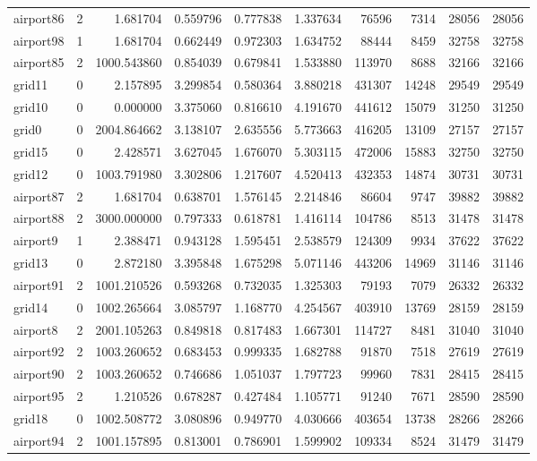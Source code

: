 \documentclass[../../../thesis.tex]{subfiles}
\begin{document}
\begin{longtable}{|l|r|r|r|r|r|r|r|r|r|}
airport86 & 2 & 1.681704 & 0.559796 & 0.777838 & 1.337634 & 76596 & 7314 & 28056 & 28056 \\
airport98 & 1 & 1.681704 & 0.662449 & 0.972303 & 1.634752 & 88444 & 8459 & 32758 & 32758 \\
airport85 & 2 & 1000.543860 & 0.854039 & 0.679841 & 1.533880 & 113970 & 8688 & 32166 & 32166 \\
grid11 & 0 & 2.157895 & 3.299854 & 0.580364 & 3.880218 & 431307 & 14248 & 29549 & 29549 \\
grid10 & 0 & 0.000000 & 3.375060 & 0.816610 & 4.191670 & 441612 & 15079 & 31250 & 31250 \\
grid0 & 0 & 2004.864662 & 3.138107 & 2.635556 & 5.773663 & 416205 & 13109 & 27157 & 27157 \\
grid15 & 0 & 2.428571 & 3.627045 & 1.676070 & 5.303115 & 472006 & 15883 & 32750 & 32750 \\
grid12 & 0 & 1003.791980 & 3.302806 & 1.217607 & 4.520413 & 432353 & 14874 & 30731 & 30731 \\
airport87 & 2 & 1.681704 & 0.638701 & 1.576145 & 2.214846 & 86604 & 9747 & 39882 & 39882 \\
airport88 & 2 & 3000.000000 & 0.797333 & 0.618781 & 1.416114 & 104786 & 8513 & 31478 & 31478 \\
airport9 & 1 & 2.388471 & 0.943128 & 1.595451 & 2.538579 & 124309 & 9934 & 37622 & 37622 \\
grid13 & 0 & 2.872180 & 3.395848 & 1.675298 & 5.071146 & 443206 & 14969 & 31146 & 31146 \\
airport91 & 2 & 1001.210526 & 0.593268 & 0.732035 & 1.325303 & 79193 & 7079 & 26332 & 26332 \\
grid14 & 0 & 1002.265664 & 3.085797 & 1.168770 & 4.254567 & 403910 & 13769 & 28159 & 28159 \\
airport8 & 2 & 2001.105263 & 0.849818 & 0.817483 & 1.667301 & 114727 & 8481 & 31040 & 31040 \\
airport92 & 2 & 1003.260652 & 0.683453 & 0.999335 & 1.682788 & 91870 & 7518 & 27619 & 27619 \\
airport90 & 2 & 1003.260652 & 0.746686 & 1.051037 & 1.797723 & 99960 & 7831 & 28415 & 28415 \\
airport95 & 2 & 1.210526 & 0.678287 & 0.427484 & 1.105771 & 91240 & 7671 & 28590 & 28590 \\
grid18 & 0 & 1002.508772 & 3.080896 & 0.949770 & 4.030666 & 403654 & 13738 & 28266 & 28266 \\
airport94 & 2 & 1001.157895 & 0.813001 & 0.786901 & 1.599902 & 109334 & 8524 & 31479 & 31479 \\

\end{longtable}
\end{document}
